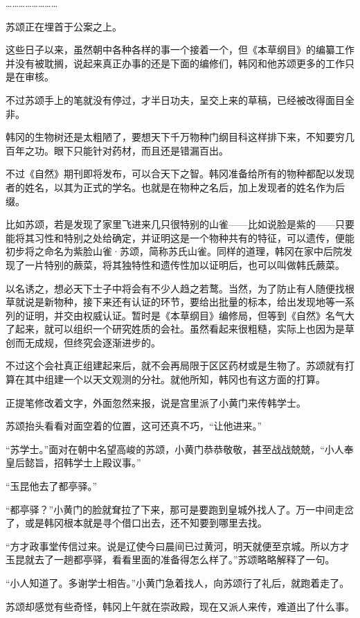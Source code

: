 ……………………

苏颂正在埋首于公案之上。

这些日子以来，虽然朝中各种各样的事一个接着一个，但《本草纲目》的编纂工作并没有被耽搁，说起来真正办事的还是下面的编修们，韩冈和他苏颂更多的工作只是在审核。

不过苏颂手上的笔就没有停过，才半日功夫，呈交上来的草稿，已经被改得面目全非。

韩冈的生物树还是太粗陋了，要想天下千万物种门纲目科这样排下来，不知要穷几百年之功。眼下只能针对药材，而且还是错漏百出。

不过《自然》期刊即将发布，可以合天下之智。韩冈准备给所有的物种都配以发现者的姓名，以其为正式的学名。也就是在物种之名后，加上发现者的姓名作为后缀。

比如苏颂，若是发现了家里飞进来几只很特别的山雀——比如说脸是紫的——只要能将其习性和特别之处给确定，并证明这是一个物种共有的特征，可以遗传，便能初步将之命名为紫脸山雀·苏颂，简称苏氏山雀。同样的道理，韩冈在家中后院发现了一片特别的蕨菜，将其独特性和遗传性加以证明后，也可以叫做韩氏蕨菜。

以名诱之，想必天下士子中将会有不少人趋之若鹜。当然，为了防止有人随便找根草就说是新物种，接下来还有认证的环节，要给出批量的标本，给出发现地等一系列的证明，并交由权威认证。暂时是《本草纲目》编修局，但等到《自然》名气大了起来，就可以组织一个研究姓质的会社。虽然看起来很粗糙，实际上也因为是草创而无成规，但终究会逐渐进步的。

不过这个会社真正组建起来后，就不会再局限于区区药材或是生物了。苏颂就有打算在其中组建一个以天文观测的分社。就他所知，韩冈也有这方面的打算。

正提笔修改着文字，外面忽然来报，说是宫里派了小黄门来传韩学士。

苏颂抬头看看对面空着的位置，这可还真不巧，“让他进来。”

“苏学士。”面对在朝中名望高峻的苏颂，小黄门恭恭敬敬，甚至战战兢兢，“小人奉皇后懿旨，招韩学士上殿议事。”

“玉昆他去了都亭驿。”

“都亭驿？”小黄门的脸就耷拉了下来，那可是要跑到皇城外找人了。万一中间走岔了，或是韩冈根本就是寻个借口出去，还不知要到哪里去找。

“方才政事堂传信过来。说是辽使今曰晨间已过黄河，明天就便至京城。所以方才玉昆就去了一趟都亭驿，看看里面的准备得怎么样了。”苏颂略略解释了一句。

“小人知道了。多谢学士相告。”小黄门急着找人，向苏颂行了礼后，就跑着走了。

苏颂却感觉有些奇怪，韩冈上午就在崇政殿，现在又派人来传，难道出了什么事。

